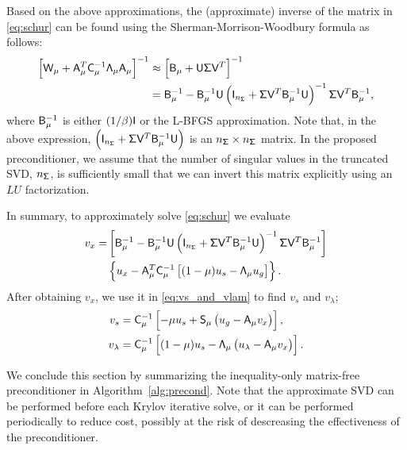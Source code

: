 Based on the above approximations, the (approximate) inverse of the matrix in
\eqref{eq:schur} can be found using the Sherman-Morrison-Woodbury formula as follows:
\begin{align}
\left[\mathsf{W}_\mu + \mathsf{A}_\mu^T \mathsf{C}_\mu^{-1}  \mathsf{\Lambda}_\mu  \mathsf{A}_\mu \right]^{-1}
&\approx
\left[\mathsf{B}_{\mu} + \mathsf{U} \mathsf{\Sigma} \mathsf{V}^T \right]^{-1} \notag \\
&= \mathsf{B}_\mu^{-1} - \mathsf{B}_\mu^{-1} \mathsf{U}  \left(  \mathsf{I}_{n_{\mathsf{\Sigma}}} +  \mathsf{\Sigma} \mathsf{V}^{T} \mathsf{B}_\mu^{-1} 
\mathsf{U} \right)^{-1} \mathsf{\Sigma} \mathsf{V}^{T} \mathsf{B}_\mu^{-1},
\label{eq:smw}
\end{align}
where $\mathsf{B}_\mu^{-1}$ is either $(1/\beta)\mathsf{I}$ or the L-BFGS
approximation.  Note that, in the above expression, $\left(\mathsf{I}_{n_{\mathsf{\Sigma}}} +
\mathsf{\Sigma} \mathsf{V}^{T} \mathsf{B}_{\mu}^{-1} \mathsf{U} \right)$ is an $n_{\mathsf{\Sigma}}\times
n_{\mathsf{\Sigma}}$ matrix.  In the proposed preconditioner, we assume that the number of
singular values in the truncated SVD, \ie $n_{\mathsf{\Sigma}}$, is sufficiently small that we
can invert this matrix explicitly using an $LU$ factorization.

In summary, to approximately solve \eqref{eq:schur} we evaluate
\begin{align}\label{eq:vx}
  v_x = &\left[\mathsf{B}_\mu^{-1} - \mathsf{B}_\mu^{-1} \mathsf{U}  \left(  \mathsf{I}_{n_{\mathsf{\Sigma}}} +  \mathsf{\Sigma} \mathsf{V}^{T} 
  \mathsf{B}_\mu^{-1} \mathsf{U} \right)^{-1} \mathsf{\Sigma} \mathsf{V}^{T} \mathsf{B}_\mu^{-1} \right]  \notag \\
  &\left\{ u_x - \mathsf{A}_\mu^T \mathsf{C}_{\mu}^{-1} \left[(1-\mu) u_s -
  \mathsf{\Lambda}_\mu u_g \right]\right\}.
\end{align}
After obtaining $v_x$, we use it in \eqref{eq:vs_and_vlam} to
find $v_s$ and $v_\lambda$;
\begin{align}
  v_s &= \mathsf{C}_\mu^{-1}\left[-\mu u_s + \mathsf{S}_\mu \left( u_g - \mathsf{A}_\mu v_x\right) \right], \label{eq:vs} \\
  v_\lambda &= \mathsf{C}_\mu^{-1}\left[(1-\mu)u_s - \mathsf{\Lambda}_\mu \left( u_\lambda - \mathsf{A}_\mu v_x \right) \right]. 
  \label{eq:vlam}
\end{align}


We conclude this section by summarizing the inequality-only matrix-free preconditioner
in Algorithm~\ref{alg:precond}.  Note that the approximate SVD can be performed
before each Krylov iterative solve, or it can be performed periodically to
reduce cost, possibly at the risk of descreasing the effectiveness of the
preconditioner.

